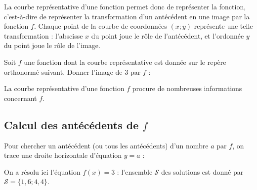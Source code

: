 \documentclass{article}
\begin{document}
\begin{remark}
La courbe représentative d'une fonction permet donc de représenter la fonction, c'est-à-dire de représenter la transformation d'un antécédent en une image par la fonction $f$. Chaque point de la courbe de coordonnées $(x;y)$ représente une telle transformation : l'abscisse $x$ du point joue le rôle de l'antécédent, et l'ordonnée $y$ du point joue le rôle de l'image.
\end{remark}
\begin{example}
Soit $f$ une fonction dont la courbe représentative est donnée sur le repère orthonormé suivant. Donner l'image de $3$ par $f$ : \answersline
\begin{center}
\end{center}
\end{example}

\newpage

\begin{tcolorbox}
La courbe représentative d'une fonction $f$ procure de nombreuses informations concernant $f$. 
\end{tcolorbox}
\subsection{Calcul des antécédents de $f$}
Pour chercher un antécédent (ou tous les antécédents) d'un nombre $a$ par $f$, on trace une droite horizontale d'équation $y = a$ :
\begin{example}
\hfill
\begin{center}
\end{center}
On a résolu ici l'équation $f(x) = 3$ : l'ensemble $\mathcal{S}$ des solutions est donné par $\mathcal{S} = \{1,6; 4,4\}$.
\end{example}
    
\end{document}
